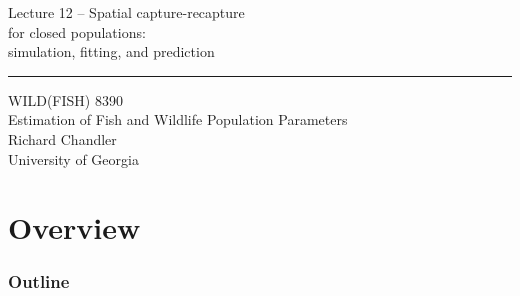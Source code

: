 \documentclass[color=usenames,dvipsnames]{beamer}\usepackage[]{graphicx}\usepackage[]{color}
\begin{document}
\begin{frame}[plain]
  \LARGE
  \centering
  {
    \LARGE Lecture 12 -- Spatial capture-recapture \\
    for closed populations: \\
    \Large simulation, fitting, and prediction \\
  }
  {\color{default} \rule{\textwidth}{0.1pt} }
  \vfill
  \large
  WILD(FISH) 8390 \\
  Estimation of Fish and Wildlife Population Parameters \\
  \vfill
  \large
  Richard Chandler \\
  University of Georgia \\
\end{frame}






\section{Overview}



\begin{frame}[plain]
  \frametitle{Outline}
  \Large
\end{frame}
\end{document}

